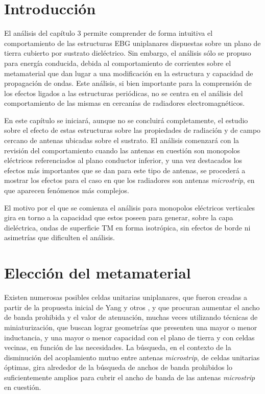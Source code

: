 

\section{Introducción}

El análisis del capítulo 3 permite comprender de forma intuitiva el comportamiento de las estructuras EBG uniplanares dispuestas sobre un plano de tierra cubierto por sustrato dieléctrico. Sin embargo, el análisis sólo se propuso para energía conducida, debida al comportamiento de corrientes sobre el metamaterial que dan lugar a una modificación en la estructura y capacidad de propagación de ondas. Este análisis, si bien importante para la comprensión de los efectos ligados a las estructuras periódicas, no se centra en el análisis del comportamiento de las mismas en cercanías de radiadores electromagnéticos.

En este capítulo se iniciará, aunque no se concluirá completamente, el estudio sobre el efecto de estas estructuras sobre las propiedades de radiación y de campo cercano de antenas ubicadas sobre el sustrato. El análisis comenzará con la revisión del comportamiento cuando las antenas en cuestión son monopolos eléctricos referenciados al plano conductor inferior, y una vez destacados los efectos más importantes que se dan para este tipo de antenas, se procederá a mostrar los efectos para el caso en que los radiadores son antenas \textit{microstrip}, en que aparecen fenómenos más complejos.

El motivo por el que se comienza el análisis para monopolos eléctricos verticales gira en torno a la capacidad que estos poseen para generar, sobre la capa dieléctrica, ondas de superficie TM en forma isotrópica, sin efectos de borde ni asimetrías que dificulten el análisis.

\section{Elección del metamaterial}
\label{sec_eleccion}

Existen numerosas posibles celdas unitarias uniplanares, que fueron creadas a partir de la propuesta inicial de Yang y otros \cite{Yang:UCPBG}, y que procuran aumentar el ancho de banda prohibida y el valor de atenuación, muchas veces utilizando técnicas de miniaturización, que buscan lograr geometrías que presenten una mayor o menor inductancia, y una mayor o menor capacidad con el plano de tierra y con celdas vecinas, en función de las necesidades. La búsqueda, en el contexto de la disminución del acoplamiento mutuo entre antenas \textit{microstrip}, de celdas unitarias óptimas, gira alrededor de la búsqueda de anchos de banda prohibidos lo suficientemente amplios para cubrir el ancho de banda de las antenas \textit{microstrip} en cuestión.

